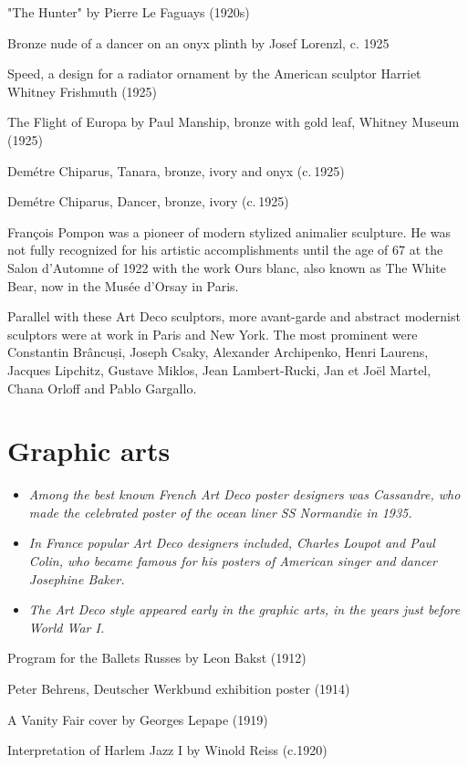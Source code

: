 "The Hunter" by Pierre Le Faguays (1920s)

Bronze nude of a dancer on an onyx plinth by Josef Lorenzl, c. 1925

Speed, a design for a radiator ornament by the American sculptor Harriet
Whitney Frishmuth (1925)

The Flight of Europa by Paul Manship, bronze with gold leaf, Whitney
Museum (1925)

Demétre Chiparus, Tanara, bronze, ivory and onyx (c. 1925)

Demétre Chiparus, Dancer, bronze, ivory (c. 1925)

François Pompon was a pioneer of modern stylized animalier sculpture. He
was not fully recognized for his artistic accomplishments until the age
of 67 at the Salon d'Automne of 1922 with the work Ours blanc, also
known as The White Bear, now in the Musée d'Orsay in Paris.

Parallel with these Art Deco sculptors, more avant-garde and abstract
modernist sculptors were at work in Paris and New York. The most
prominent were Constantin Brâncuși, Joseph Csaky, Alexander Archipenko,
Henri Laurens, Jacques Lipchitz, Gustave Miklos, Jean Lambert-Rucki, Jan
et Joël Martel, Chana Orloff and Pablo Gargallo.

\section{Graphic arts}\label{graphic-arts}

\begin{itemize}
\item
  \emph{Among the best known French Art Deco poster designers was
  Cassandre, who made the celebrated poster of the ocean liner SS
  Normandie in 1935.}
\item
  \emph{In France popular Art Deco designers included, Charles Loupot
  and Paul Colin, who became famous for his posters of American singer
  and dancer Josephine Baker.}
\item
  \emph{The Art Deco style appeared early in the graphic arts, in the
  years just before World War I.}
\end{itemize}

Program for the Ballets Russes by Leon Bakst (1912)

Peter Behrens, Deutscher Werkbund exhibition poster (1914)

A Vanity Fair cover by Georges Lepape (1919)

Interpretation of Harlem Jazz I by Winold Reiss (c.1920)

